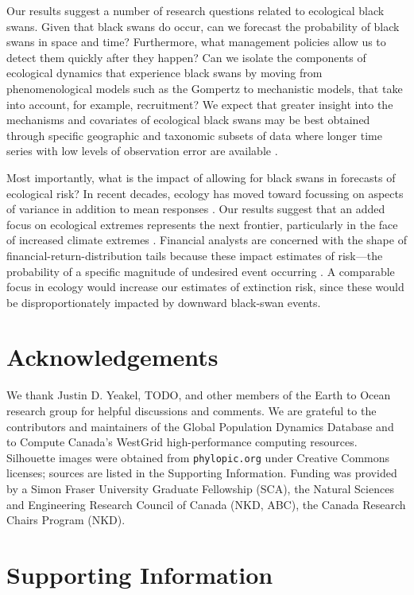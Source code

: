Our results suggest a number of research questions related to ecological black swans. Given that black swans do occur, can we forecast the probability of black swans in space and time? Furthermore, what management policies allow us to detect them quickly after they happen? Can we isolate the components of ecological dynamics that experience black swans by moving from phenomenological models such as the Gompertz to mechanistic models, that take into account, for example, recruitment? We expect that greater insight into the mechanisms and covariates of ecological black swans may be best obtained through specific geographic and taxonomic subsets of data where longer time series with low levels of observation error are available \citep[e.g.][]{segura2013}.

Most importantly, what is the impact of allowing for black swans in forecasts of ecological risk? In recent decades, ecology has moved toward focussing on aspects of variance in addition to mean responses \citep[e.g.][]{loreau2010a, thompson2013}. Our results suggest that an added focus on ecological extremes represents the next frontier, particularly in the face of increased climate extremes \citep{meehl2004,ipcc2012}. Financial analysts are concerned with the shape of financial-return-distribution tails because these impact estimates of risk---the probability of a specific magnitude of undesired event occurring \citep{rachev2008}. A comparable focus in ecology would increase our estimates of extinction risk, since these would be disproportionately impacted by downward black-swan events.

\section{Acknowledgements}

We thank Justin D. Yeakel, TODO, and other members of the Earth to Ocean research group for helpful discussions and comments. We are grateful to the contributors and maintainers of the Global Population Dynamics Database and to Compute Canada's WestGrid high-performance computing resources. Silhouette images were obtained from \texttt{phylopic.org} under Creative Commons licenses; sources are listed in the Supporting Information. Funding was provided by a Simon Fraser University Graduate Fellowship (SCA), the Natural Sciences and Engineering Research Council of Canada (NKD, ABC), the Canada Research Chairs Program (NKD).

\section{Supporting Information}

